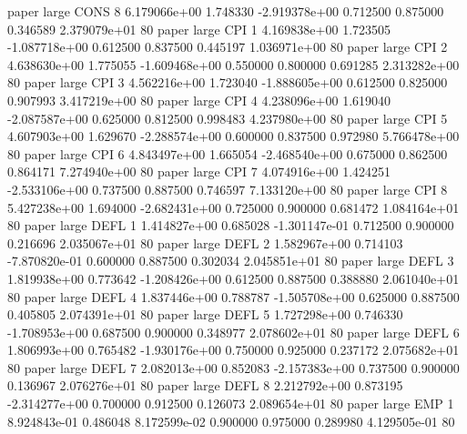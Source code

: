               paper      large     CONS                 8 6.179066e+00      1.748330 -2.919378e+00 0.712500 0.875000       0.346589 2.379079e+01 80
              paper      large      CPI                 1 4.169838e+00      1.723505 -1.087718e+00 0.612500 0.837500       0.445197 1.036971e+00 80
              paper      large      CPI                 2 4.638630e+00      1.775055 -1.609468e+00 0.550000 0.800000       0.691285 2.313282e+00 80
              paper      large      CPI                 3 4.562216e+00      1.723040 -1.888605e+00 0.612500 0.825000       0.907993 3.417219e+00 80
              paper      large      CPI                 4 4.238096e+00      1.619040 -2.087587e+00 0.625000 0.812500       0.998483 4.237980e+00 80
              paper      large      CPI                 5 4.607903e+00      1.629670 -2.288574e+00 0.600000 0.837500       0.972980 5.766478e+00 80
              paper      large      CPI                 6 4.843497e+00      1.665054 -2.468540e+00 0.675000 0.862500       0.864171 7.274940e+00 80
              paper      large      CPI                 7 4.074916e+00      1.424251 -2.533106e+00 0.737500 0.887500       0.746597 7.133120e+00 80
              paper      large      CPI                 8 5.427238e+00      1.694000 -2.682431e+00 0.725000 0.900000       0.681472 1.084164e+01 80
              paper      large     DEFL                 1 1.414827e+00      0.685028 -1.301147e-01 0.712500 0.900000       0.216696 2.035067e+01 80
              paper      large     DEFL                 2 1.582967e+00      0.714103 -7.870820e-01 0.600000 0.887500       0.302034 2.045851e+01 80
              paper      large     DEFL                 3 1.819938e+00      0.773642 -1.208426e+00 0.612500 0.887500       0.388880 2.061040e+01 80
              paper      large     DEFL                 4 1.837446e+00      0.788787 -1.505708e+00 0.625000 0.887500       0.405805 2.074391e+01 80
              paper      large     DEFL                 5 1.727298e+00      0.746330 -1.708953e+00 0.687500 0.900000       0.348977 2.078602e+01 80
              paper      large     DEFL                 6 1.806993e+00      0.765482 -1.930176e+00 0.750000 0.925000       0.237172 2.075682e+01 80
              paper      large     DEFL                 7 2.082013e+00      0.852083 -2.157383e+00 0.737500 0.900000       0.136967 2.076276e+01 80
              paper      large     DEFL                 8 2.212792e+00      0.873195 -2.314277e+00 0.700000 0.912500       0.126073 2.089654e+01 80
              paper      large      EMP                 1 8.924843e-01      0.486048  8.172599e-02 0.900000 0.975000       0.289980 4.129505e-01 80
